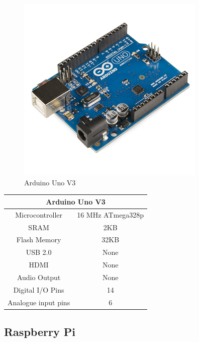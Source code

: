 \documentclass[10pt]{article}
\begin{document}
\begin{figure}[h]
\centering
\caption{Arduino Uno V3}
\label{Arduino Uno V3}
\includegraphics[height=9cm]{images/Arduino.jpg}
\end{figure}

\begin{center}
	\begin{tabular}{ | c | c | }
		\hline
	 	\multicolumn{2}{|c|}{Arduino Uno V3} \\ \hline
		Microcontroller 	& 16 MHz ATmega328p \\ \hline
		SRAM 			& 2KB \\ \hline
		Flash Memory	& 32KB \\ \hline
		USB 2.0		& None \\ \hline
		HDMI 			& None \\ \hline
		Audio Output	& None \\ \hline
		Digital I/O Pins	& 14 \\ \hline
		Analogue input pins & 6 \\ \hline
	\end{tabular}
\end{center}
\newpage
\subsection{Raspberry Pi}
\end{document}
